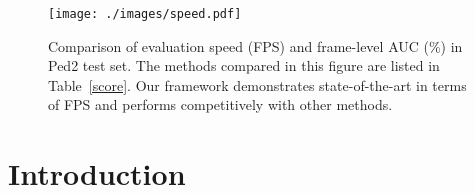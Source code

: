 \documentclass[10pt,twocolumn,letterpaper]{article}
\begin{document}
\begin{figure}[!t]
	\begin{center}
		\texttt{[image: ./images/speed.pdf]}
	\end{center}
	\caption{Comparison of evaluation speed (FPS) and frame-level AUC (\%) in Ped2 test set. The methods compared in this figure are listed in Table~\ref{score}. Our framework demonstrates state-of-the-art in terms of FPS and performs competitively with other methods.}
	\label{speed}
\end{figure}
\vspace{-1.0em}


\vspace{-0.2cm}


\section{Introduction}
\end{document}
